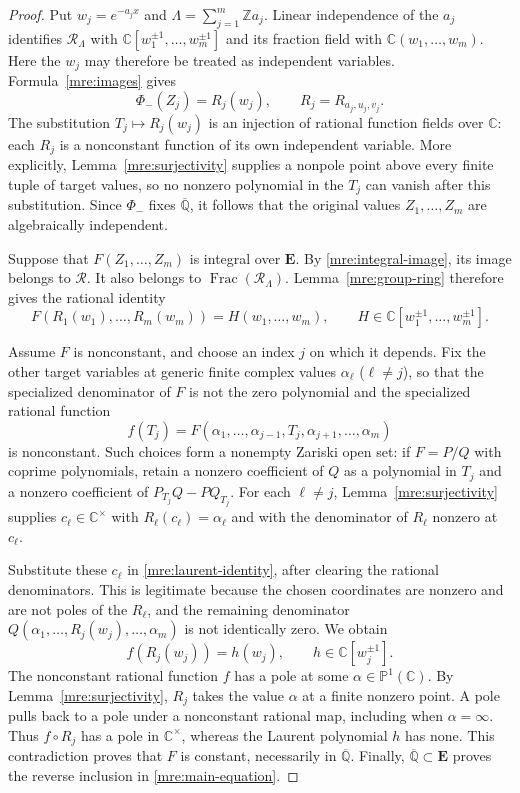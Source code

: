 \documentclass[11pt]{article}
\theoremstyle{definition}
\theoremstyle{remark}
\newcommand{\Qa}{\overline{\mathbb Q}}
\newcommand{\E}{\mathbf E}
\begin{document}
\begin{proof}
Put $w_j=e^{-a_jx}$ and
$\Lambda=\sum_{j=1}^m\mathbb Za_j$. Linear independence of the $a_j$
identifies $\mathcal R_\Lambda$ with
$\mathbb C[w_1^{\pm1},\ldots,w_m^{\pm1}]$ and its fraction field with
$\mathbb C(w_1,\ldots,w_m)$. Here the $w_j$ may therefore be treated as
independent variables. Formula~\eqref{mre:images} gives
\[
 \Phi_-(Z_j)=R_j(w_j),\qquad R_j=R_{a_j,u_j,v_j}.
\]
The substitution $T_j\mapsto R_j(w_j)$ is an injection of rational
function fields over $\mathbb C$: each $R_j$ is a nonconstant function
of its own independent variable. More explicitly,
Lemma~\ref{mre:surjectivity} supplies a nonpole point above every finite
tuple of target values, so no nonzero polynomial in the $T_j$ can vanish
after this substitution. Since $\Phi_-$ fixes $\Qa$, it follows that
the original values $Z_1,\ldots,Z_m$ are algebraically independent.

Suppose that $F(Z_1,\ldots,Z_m)$ is integral over $\E$. By
\eqref{mre:integral-image}, its image belongs to $\mathcal R$.
It also belongs to $\operatorname{Frac}(\mathcal R_\Lambda)$.
Lemma~\ref{mre:group-ring} therefore gives the rational identity
\begin{equation}\label{mre:laurent-identity}
 F(R_1(w_1),\ldots,R_m(w_m))
 =H(w_1,\ldots,w_m),
 \qquad
 H\in\mathbb C[w_1^{\pm1},\ldots,w_m^{\pm1}].
\end{equation}

Assume $F$ is nonconstant, and choose an index $j$ on which it depends.
Fix the other target variables at generic finite complex values
$\alpha_\ell$ ($\ell\ne j$), so that the specialized denominator of
$F$ is not the zero polynomial and the specialized rational function
\[
 f(T_j)=F(\alpha_1,\ldots,\alpha_{j-1},T_j,
                  \alpha_{j+1},\ldots,\alpha_m)
\]
is nonconstant. Such choices form a nonempty Zariski open set: if
$F=P/Q$ with coprime polynomials, retain a nonzero coefficient of $Q$
as a polynomial in $T_j$ and a nonzero coefficient of
$P_{T_j}Q-PQ_{T_j}$.
For each $\ell\ne j$, Lemma~\ref{mre:surjectivity} supplies
$c_\ell\in\mathbb C^\times$ with
$R_\ell(c_\ell)=\alpha_\ell$ and with the denominator of
$R_\ell$ nonzero at $c_\ell$.

Substitute these $c_\ell$ in \eqref{mre:laurent-identity}, after
clearing the rational denominators. This is legitimate because the
chosen coordinates are nonzero and are not poles of the $R_\ell$,
and the remaining denominator $Q(\alpha_1,\ldots,R_j(w_j),\ldots,
\alpha_m)$ is not identically zero. We obtain
\[
 f(R_j(w_j))=h(w_j),\qquad h\in\mathbb C[w_j^{\pm1}].
\]
The nonconstant rational function $f$ has a pole at some
$\alpha\in\mathbb P^1(\mathbb C)$. By
Lemma~\ref{mre:surjectivity}, $R_j$ takes the value $\alpha$ at a finite
nonzero point. A pole pulls back to a pole under a nonconstant rational
map, including when $\alpha=\infty$. Thus $f\circ R_j$ has a pole in
$\mathbb C^\times$, whereas the Laurent polynomial $h$ has none.
This contradiction proves that $F$ is constant, necessarily in $\Qa$.
Finally, $\Qa\subset\E$ proves the reverse inclusion in
\eqref{mre:main-equation}.
\end{proof}
\end{document}
